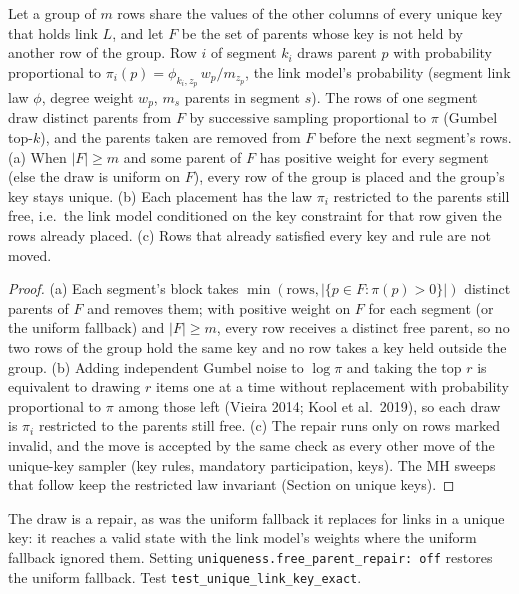 \setcounter{proposition}{1879}
\begin{proposition}\label{prop:freeparents}
Let a group of $m$ rows share the values of the other columns of every unique key that holds link $L$, and let $F$ be the set of parents whose key is not held by another row of the group. Row $i$ of segment $k_i$ draws parent $p$ with probability proportional to $\pi_i(p)=\phi_{k_i,z_p}\,w_p/m_{z_p}$, the link model's probability (segment link law $\phi$, degree weight $w_p$, $m_s$ parents in segment $s$). The rows of one segment draw distinct parents from $F$ by successive sampling proportional to $\pi$ (Gumbel top-$k$), and the parents taken are removed from $F$ before the next segment's rows. (a) When $|F|\ge m$ and some parent of $F$ has positive weight for every segment (else the draw is uniform on $F$), every row of the group is placed and the group's key stays unique. (b) Each placement has the law $\pi_i$ restricted to the parents still free, i.e.\ the link model conditioned on the key constraint for that row given the rows already placed. (c) Rows that already satisfied every key and rule are not moved.
\end{proposition}
\begin{proof}
(a) Each segment's block takes $\min(\text{rows},|\{p\in F:\pi(p)>0\}|)$ distinct parents of $F$ and removes them; with positive weight on $F$ for each segment (or the uniform fallback) and $|F|\ge m$, every row receives a distinct free parent, so no two rows of the group hold the same key and no row takes a key held outside the group. (b) Adding independent Gumbel noise to $\log\pi$ and taking the top $r$ is equivalent to drawing $r$ items one at a time without replacement with probability proportional to $\pi$ among those left (Vieira 2014; Kool et al.\ 2019), so each draw is $\pi_i$ restricted to the parents still free. (c) The repair runs only on rows marked invalid, and the move is accepted by the same check as every other move of the unique-key sampler (key rules, mandatory participation, keys). The MH sweeps that follow keep the restricted law invariant (Section on unique keys).
\end{proof}
\noindent The draw is a repair, as was the uniform fallback it replaces for links in a unique key: it reaches a valid state with the link model's weights where the uniform fallback ignored them. Setting \texttt{uniqueness.free\_parent\_repair: off} restores the uniform fallback. Test \texttt{test\_unique\_link\_key\_exact}.

